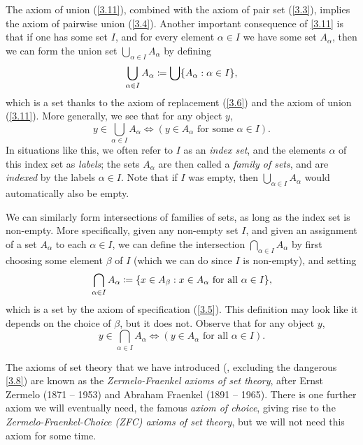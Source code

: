 \begin{note}
	The axiom of union (\cref{3.11}), combined with the axiom of pair set (\cref{3.3}), implies the axiom of pairwise union (\cref{3.4}).
	Another important consequence of \cref{3.11} is that if one has some set \(I\), and for every element \(\alpha \in I\) we have some set \(A_{\alpha}\), then we can form the union set \(\bigcup_{\alpha \in I} A_{\alpha}\) by defining
	\[
		\bigcup_{\alpha \in I} A_{\alpha} \coloneqq \bigcup \set{A_{\alpha} : \alpha \in I},
	\]
	which is a set thanks to the axiom of replacement (\cref{3.6}) and the axiom of union (\cref{3.11}).
	More generally, we see that for any object \(y\),
	\[
		y \in \bigcup_{\alpha \in I} A_{\alpha} \iff (y \in A_{\alpha} \text{ for some } \alpha \in I).
	\]
	In situations like this, we often refer to \(I\) as an \emph{index set}, and the elements \(\alpha\) of this index set as \emph{labels};
	the sets \(A_{\alpha}\) are then called a \emph{family of sets}, and are \emph{indexed} by the labels \(\alpha \in I\).
	Note that if \(I\) was empty, then \(\bigcup_{\alpha \in I} A_{\alpha}\) would automatically also be empty.
\end{note}

\begin{note}
	We can similarly form intersections of families of sets, as long as the index set is non-empty.
	More specifically, given any non-empty set \(I\), and given an assignment of a set \(A_{\alpha}\) to each \(\alpha \in I\), we can define the intersection \(\bigcap_{\alpha \in I} A_{\alpha}\) by first choosing some element \(\beta\) of \(I\) (which we can do since \(I\) is non-empty), and setting
	\[
		\bigcap_{\alpha \in I} A_{\alpha} \coloneqq \set{x \in A_{\beta} : x \in A_{\alpha} \text{ for all } \alpha \in I},
	\]
	which is a set by the axiom of specification (\cref{3.5}).
	This definition may look like it depends on the choice of \(\beta\), but it does not.
	Observe that for any object \(y\),
	\[
		y \in \bigcap_{\alpha \in I} A_{\alpha} \iff (y \in A_{\alpha} \text{ for all } \alpha \in I).
	\]
\end{note}

\setcounter{thm}{11}
\begin{rmk}\label{3.4.12}
	The axioms of set theory that we have introduced (, excluding the dangerous \cref{3.8}) are known as the \emph{Zermelo-Fraenkel axioms of set theory}, after Ernst Zermelo (1871 -- 1953) and Abraham Fraenkel (1891 -- 1965).
	There is one further axiom we will eventually need, the famous \emph{axiom of choice}, giving rise to the \emph{Zermelo-Fraenkel-Choice (ZFC) axioms of set theory}, but we will not need this axiom for some time.
\end{rmk}


